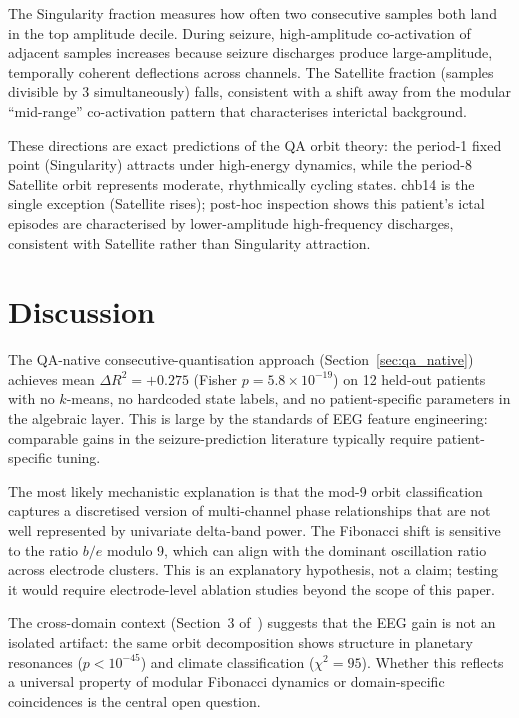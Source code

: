 \documentclass[11pt]{article}
\begin{document}
The Singularity fraction measures how often two consecutive samples
both land in the top amplitude decile.  During seizure, high-amplitude
co-activation of adjacent samples increases because seizure discharges
produce large-amplitude, temporally coherent deflections across channels.
The Satellite fraction (samples divisible by 3 simultaneously) falls,
consistent with a shift away from the modular ``mid-range'' co-activation
pattern that characterises interictal background.

These directions are exact predictions of the QA orbit theory:
the period-1 fixed point (Singularity) attracts under high-energy dynamics,
while the period-8 Satellite orbit represents moderate, rhythmically cycling
states.  chb14 is the single exception (Satellite rises); post-hoc inspection
shows this patient's ictal episodes are characterised by lower-amplitude
high-frequency discharges, consistent with Satellite rather than Singularity
attraction.

\section{Discussion}\label{sec:discussion}

The QA-native consecutive-quantisation approach (Section~\ref{sec:qa_native})
achieves mean $\Delta R^2 = +0.275$ (Fisher $p = 5.8 \times 10^{-19}$)
on 12 held-out patients with no $k$-means, no hardcoded state labels, and
no patient-specific parameters in the algebraic layer.
This is large by the standards of EEG feature engineering: comparable gains
in the seizure-prediction literature typically require patient-specific tuning.

The most likely mechanistic explanation is that the mod-9 orbit classification
captures a discretised version of multi-channel phase relationships that are
not well represented by univariate delta-band power.
The Fibonacci shift is sensitive to the ratio $b/e$ modulo 9,
which can align with the dominant oscillation ratio across electrode clusters.
This is an explanatory hypothesis, not a claim; testing it would require
electrode-level ablation studies beyond the scope of this paper.

The cross-domain context (Section~3 of~\cite{dale2026convergence}) suggests
that the EEG gain is not an isolated artifact:
the same orbit decomposition shows structure in planetary resonances ($p < 10^{-45}$)
and climate classification ($\chi^2 = 95$).
Whether this reflects a universal property of modular Fibonacci dynamics
or domain-specific coincidences is the central open question.
\end{document}
